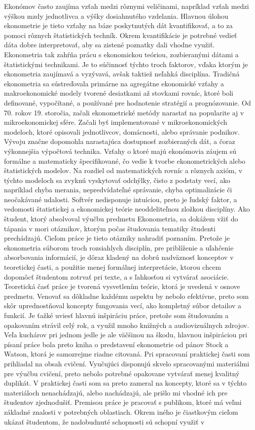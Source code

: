 \documentclass[]{tukediphc}
\begin{document}
Ekonómov často zaujíma vzťah medzi rôznymi veličinami, napríklad vzťah medzi výškou mzdy jednotlivca a výšky dosiahnutého vzdelania. Hlavnou úlohou ekonometrie je tieto vzťahy na báze poskytnutých dát kvantifikovať, a to za pomoci rôznych štatistických techník. Okrem kvantifikácie je potrebné vedieť dáta dobre interpretovať, aby sa zistené poznatky dali vhodne využiť. Ekonometria tak zahŕňa prácu s ekonomickou teóriou, zozbieranými dátami a štatistickými technikami. Je to súčinnosť týchto troch faktorov, vďaka ktorým je ekonometria zaujímavá a vyzývavá, avšak taktiež neľahká disciplína. Tradičná ekonometria sa sústreďovala primárne na agregátne ekonomické vzťahy a makroekonomické modely tvorené desiatkami až stovkami rovníc, ktoré boli definované, vypočítané, a používané pre hodnotenie stratégií a prognózovanie. Od 70. rokov 19. storočia, začali ekonometrické metódy narastať na popularite aj v mikroekonomickej sfére. Začali byť implementované v mikroekonomických modeloch, ktoré opisovali jednotlivcov, domácnosti, alebo správanie podnikov. Vývoju značne dopomohla narastajúca dostupnosť zozbieraných dát, a čoraz výkonnejšia výpočtová technika. Vzťahy o ktoré majú ekonómovia záujem sú formálne a matematicky špecifikované, čo vedie k tvorbe ekonometrických alebo štatistických modelov. Na rozdiel od matematických rovníc a rôznych axióm, v týchto modeloch sa zvyknú vyskytovať odchýlky, čisto z podstaty vecí, ako napríklad chyba merania, nepredvídateľné správanie, chyba optimalizácie či neočakávané udalosti. Softvér nedisponuje intuíciou, preto je ľudský faktor, a vedomosti štatistickej a ekonomickej teórie neoddeliteľnou zložkou disciplíny. Ako študent, ktorý absolvoval výučbu predmetu Ekonometria, sa dokážem vžiť do tápania v mori otáznikov, ktorým počas študovania tematiky študenti prechádzajú. Cieľom práce je tieto otázniky nahradiť poznaním. Pretože je ekonometria súborom troch rozsiahlych disciplín, pre priblíženie a uľahčenie absorbovania informácií, je dôraz kladený na dobrú nadväznosť konceptov v teoretickej časti, a použitie menej formálnej interpretácie, ktorou chcem dopomôcť študentom zotrvať pri texte, a s ľahkosťou si vytvárať asociácie. Teoretická časť práce je tvorená vysvetlením teórie, ktorá je uvedená v osnove predmetu. Venovať sa dôkladne každému aspektu by nebolo efektívne, preto som skôr uprednostňoval koncepty fungovania vecí, ako kompletný súbor detailov a funkcií. Je ťažké uviesť hlavnú inšpiráciu práce, pretože som študovaním a opakovaním strávil celý rok, a využil mnoho knižných a audiovizuálnych zdrojov. Veľa kuchárov pri jednom jedle je ale väčšinou na škodu, hlavnou inšpiráciou pri písaní práce bola preto kniha o predstavení ekonometrie od pánov Stock a Watson, ktorá je samozrejme riadne citovaná. Pri spracovaní praktickej časti som prihliadal na obsah cvičení. Vyučujúci disponujú skvelo spracovanými materiálmi pre výučbu cvičení, preto nebolo potrebné opakovane vytvárať menej kvalitný duplikát. V praktickej časti som sa preto zameral na koncepty, ktoré sa v týchto materiáloch nenachádzajú, alebo nachádzajú, ale prišlo mi vhodné ich pre študentov zjednodušiť. Premisou práce je pracovať s publikom, ktoré má veľmi základné znalosti v potrebných oblastiach. Okrem iného je čiastkovým cieľom ukázať študentom, že nadobudnuté schopnosti sú schopní využiť v 
\end{document}
